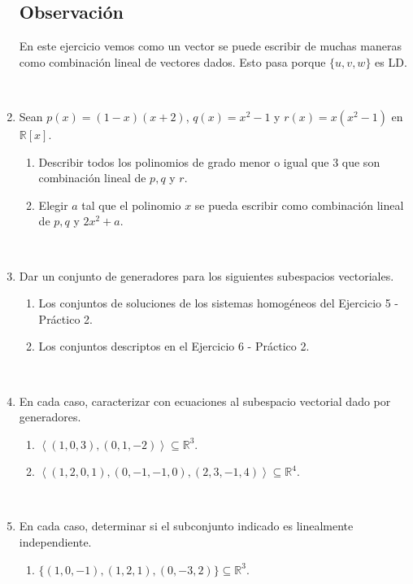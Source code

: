 \documentclass[12pt]{amsart}
\begin{document}
\begin{enumerate}
\subsection*{Observaci\'on} En este ejercicio vemos como un vector se puede escribir de muchas maneras como combinaci\'on lineal de vectores dados. Esto pasa porque $\{u,v,w\}$ es LD.

\

\item Sean $p(x)=(1-x)(x+2)$, $q(x)=x^2-1$ y $r(x)=x(x^2-1)$ en $\mathbb{R}[x]$.

\begin{enumerate}
\item Describir todos los polinomios de grado menor o igual que $3$ que son combinaci\' on lineal de $p,q$ y $r$.

\item Elegir $a$ tal que el polinomio $x$ se pueda escribir como combinaci\'on lineal de $p,q$ y $2x^2+a$.
 \end{enumerate}

 \

\item\label{practicos anteriores} Dar un conjunto de generadores para los siguientes subespacios vectoriales.

\begin{enumerate}
\item Los conjuntos de soluciones de los sistemas homog\'eneos del Ejercicio 5 - Pr\'actico 2.
\item Los conjuntos descriptos en el Ejercicio 6 - Pr\'actico 2.
\end{enumerate}

\

\item\label{caracterizar}  En cada caso, caracterizar con ecuaciones al subespacio vectorial dado por generadores.

\begin{enumerate}
\item ${\left\langle(1,0,3),(0,1,-2)\right\rangle}\subseteq \mathbb{R}^3$.
\item ${\left\langle(1,2,0,1),(0,-1,-1,0),(2,3,-1,4)\right\rangle}\subseteq \mathbb{R}^4$.
\end{enumerate}

\

\item\label{son LI} En cada caso, determinar si el subconjunto indicado es linealmente independiente.

\begin{enumerate}
	\item $\{ (1,0,-1), (1,2,1), (0,-3,2) \}\subseteq \mathbb{R}^3$.


\end{enumerate}
\end{enumerate}
\end{document}
